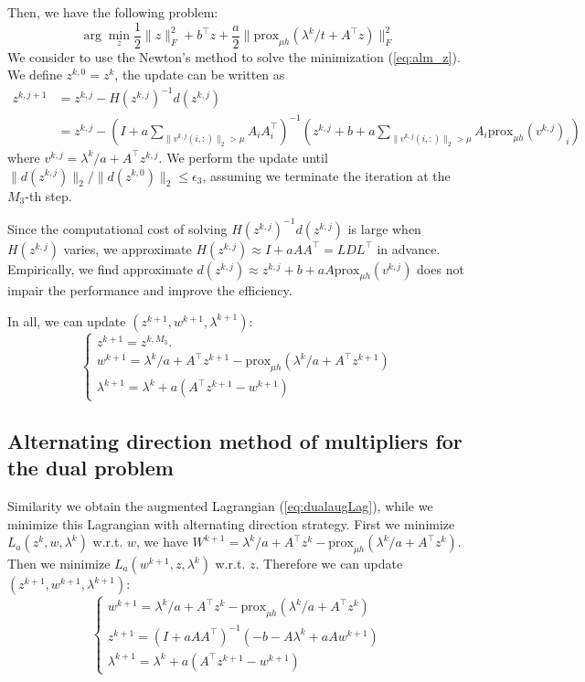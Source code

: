 \documentclass{article}
\numberwithin{equation}{section}
\numberwithin{figure}{section}
\begin{document}
Then, we have the following problem:
\begin{equation}
\label{eq:alm_z}
    \arg\min_z \frac{1}{2}\|z\|_F^2+b^\top z+\frac{a}{2}\|\mathrm{prox}_{\mu h }(\lambda^k/t+A^\top z)\|_F^2
\end{equation}
We consider to use the Newton's method to solve the minimization (\ref{eq:alm_z}). We define $z^{k,0}=z^k$, the update can be written as
\begin{equation}
\begin{split}
        z^{k,j+1}&=z^{k,j}-H({z^{k,j}})^{-1}d({z^{k,j}})\\
        &=z^{k,j} - (I+a\sum_{\|v^{k,j}(i,:)\|_2>\mu}A_iA_i^\top)^{-1}(z^{k,j}+b+a\sum_{\|v^{k,j}(i,:)\|_2>\mu}A_i\mathrm{prox}_{\mu h }(v^{k,j})_i )
\end{split}
\end{equation}
where $v^{k,j} = \lambda^k/a +A^\top z^{k,j}$.
We perform the update until $\|d(z^{k,j})\|_2/\|d(z^{k,0})\|_2\leq \epsilon_3$, assuming we terminate the iteration at the $M_3$-th step.

Since the computational cost of solving $H({z^{k,j}})^{-1}d({z^{k,j}})$ is large when $H({z^{k,j}})$ varies, we approximate $H({z^{k,j}})\approx I+aAA^\top=LDL^\top$ in advance. Empirically, we find approximate $d({z^{k,j}})\approx {z^{k,j}}+b+aA\mathrm{prox}_{\mu h }(v^{k,j})$ does not impair the performance and improve the efficiency.

In all, we can update $(z^{k+1},w^{k+1},\lambda^{k+1})$:
\begin{equation}
\label{eq:alm_update}
    \begin{cases}
    z^{k+1}=z^{k,M_3}.\\
    w^{k+1}=\lambda^k/a+A^\top z^{k+1}-\mathrm{prox}_{\mu h }(\lambda^k/a+A^\top z^{k+1})\\
    \lambda^{k+1}=\lambda^k+a(A^\top z^{k+1}-w^{k+1})
    \end{cases}
\end{equation}
\subsection{Alternating direction method of multipliers for the dual problem}
Similarity we obtain the augmented Lagrangian (\ref{eq:dualaugLag}), while we minimize this Lagrangian with alternating direction strategy. First we minimize $L_a(z^k,w,\lambda^k)$ w.r.t. $w$, we have
$W^{k+1}=\lambda^k/a+A^\top z^{k}-\mathrm{prox}_{\mu h }(\lambda^k/a+A^\top z^{k})$. Then we minimize $L_a(w^{k+1},z,\lambda^k)$ w.r.t. $z$. Therefore we can update $(z^{k+1},w^{k+1},\lambda^{k+1})$:
\begin{equation}
\label{eq:admm_dual_update}
    \begin{cases}
    w^{k+1}=\lambda^k/a+A^\top z^{k}-\mathrm{prox}_{\mu h }(\lambda^k/a+A^\top z^{k})\\
    z^{k+1}=(I+aAA^\top)^{-1}(-b-A\lambda^k+aAw^{k+1})\\
    \lambda^{k+1}=\lambda^k+a(A^\top z^{k+1}-w^{k+1})
    \end{cases}
\end{equation}
\end{document}
